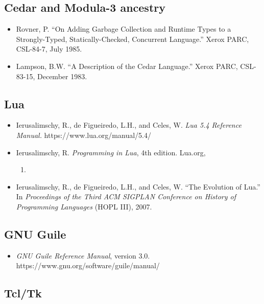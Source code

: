\documentclass[
  12pt,
]{report}
\providecommand{\tightlist}{%
  \setlength{\itemsep}{0pt}\setlength{\parskip}{0pt}}
\begin{document}
\subsection{Cedar and Modula-3
ancestry}\label{cedar-and-modula-3-ancestry}

\begin{itemize}
\item
  Rovner, P. ``On Adding Garbage Collection and Runtime Types to a
  Strongly-Typed, Statically-Checked, Concurrent Language.'' Xerox PARC,
  CSL-84-7, July 1985.
\item
  Lampson, B.W. ``A Description of the Cedar Language.'' Xerox PARC,
  CSL-83-15, December 1983.
\end{itemize}

\subsection{Lua}\label{lua}

\begin{itemize}
\item
  Ierusalimschy, R., de Figueiredo, L.H., and Celes, W. \emph{Lua 5.4
  Reference Manual.} https://www.lua.org/manual/5.4/
\item
  Ierusalimschy, R. \emph{Programming in Lua}, 4th edition. Lua.org,

  \begin{enumerate}
  \def\labelenumi{\arabic{enumi}.}
  \setcounter{enumi}{2015}
  \tightlist
  \item
  \end{enumerate}
\item
  Ierusalimschy, R., de Figueiredo, L.H., and Celes, W. ``The Evolution
  of Lua.'' In \emph{Proceedings of the Third ACM SIGPLAN Conference on
  History of Programming Languages} (HOPL III), 2007.
\end{itemize}

\subsection{GNU Guile}\label{gnu-guile}

\begin{itemize}
\tightlist
\item
  \emph{GNU Guile Reference Manual}, version 3.0.
  https://www.gnu.org/software/guile/manual/
\end{itemize}

\subsection{Tcl/Tk}\label{tcltk}
\end{document}
